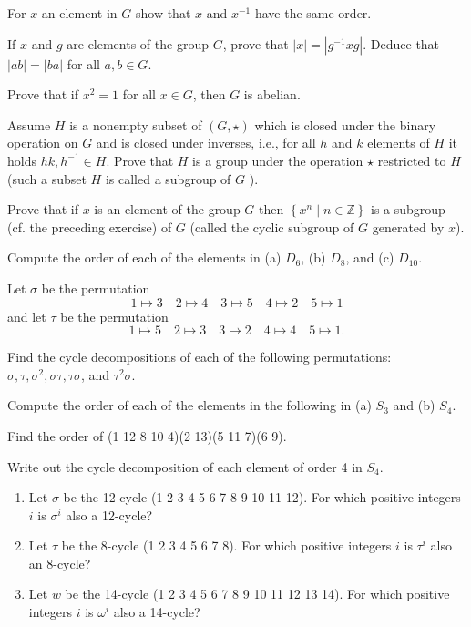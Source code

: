 \documentclass[
    11pt,a4paper,
]{exam}
\begin{document}
\begin{questions}
    \question
    For \(x\) an element in \(G\) show that \(x\) and \(x^{-1}\) have the same order.
    
    
    \question 
    If \(x\) and \(g\) are elements of the group \(G\), prove that \(|x|=\left|g^{-1} x g\right|\). Deduce that \(|a b|=|b a|\) for all \(a, b \in G\).
    
    \question
     Prove that if \(x^2=1\) for all \(x \in G\), then \(G\) is abelian.
    
    \question
    Assume \({H}\) is a nonempty subset of \((G, \star)\) which is closed under the binary operation on \(G\) and is closed under inverses, i.e., for all \(h\) and \(k\) elements of \(H\) it holds    \(hk,h^{-1} \in H\). Prove that \(H\) is a group under the operation \(\star\) restricted to \(H\) (such a subset \(H\) is called a subgroup of \(G\) ).
    
    \question
    Prove that if \(x\) is an element of the group \(G\) then \(\left\{x^n \mid n \in \mathbb{Z}\right\}\) is a subgroup (cf. the preceding exercise) of \(G\) (called the cyclic subgroup of \(G\) generated by \(x\)).
    
    \question
    Compute the order of each of the elements in  (a) \(D_6\), (b) \(D_8\), and (c) \(D_{10}\).
    
    
    
    \question
    Let \(\sigma\) be the permutation
    \[
    1 \mapsto 3 \quad 2 \mapsto 4 \quad 3 \mapsto 5 \quad 4 \mapsto 2 \quad 5 \mapsto 1
    \]
    and let \(\tau\) be the permutation
    \[
    1 \mapsto 5 \quad 2 \mapsto 3 \quad 3 \mapsto 2 \quad 4 \mapsto 4 \quad 5 \mapsto 1 .
    \]
    
    Find the cycle decompositions of each of the following permutations: \(\sigma, \tau, \sigma^2, \sigma \tau, \tau \sigma\), and \(\tau^2 \sigma\).
    
    
    
    
    \question
    
    Compute the order of each of the elements in the following in (a) \(S_3\) and (b) \(S_4\).
    
    \question
    Find the order of (1 12 8 10 4)(2 13)(5 11 7)(6 9).
    
    
    \question
    Write out the cycle decomposition of each element of order 4 in \(S_4\).
    
    
    \question
    \begin{enumerate}[label=(\alph*)]
        \item Let \(\sigma\) be the 12-cycle (1 2 3 4 5 6 7 8 9 10 11 12). For which positive integers \(i\) is \(\sigma^i\) also a 12-cycle?
        \item Let \(\tau\) be the 8-cycle (1 2 3 4 5 6 7 8). For which positive integers \(i\) is \(\tau^i\) also an 8-cycle?
        \item Let \(w\) be the 14-cycle (1 2 3 4 5 6 7 8 9 10 11 12 13 14). For which positive integers \(i\) is \(\omega^i\) also a 14-cycle?
    \end{enumerate}
    

\end{questions}
\end{document}
